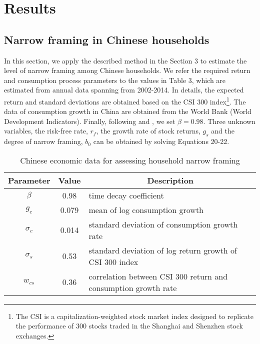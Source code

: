 \documentclass[ukenglish,nottitlepage,thmsb,11pt,letterpaper]{article}
\begin{document}
\section{Results}

 

\subsection{Narrow framing in Chinese households}

In this section, we apply the described method  in the Section 3 to estimate the level of narrow framing among Chinese households. We refer the required return and consumption process parameters to the values in Table 3, which are estimated from annual data spanning from 2002-2014. In details, the expected return and standard deviations are obtained based on the CSI 300 index\footnote{The CSI is a capitalization-weighted stock market index designed to replicate the performance of 300 stocks traded in the Shanghai and Shenzhen stock exchanges.}. The data of  consumption growth in China are obtained from the World Bank (World Development Indicators). Finally, following \citet{Barberis2009} and \citet{Giorgi2012}, we set $\beta = 0.98$. Three unknown variables, the risk-free rate, $r_f$, the growth rate of stock returns, $g_s$ and the degree of narrow framing, $b_0$ can be obtained by solving Equations 20-22. 


\begin{spacing}{1}
\begin{table}[H]
	\renewcommand\arraystretch{1.5}%
	\centering
	\caption{Chinese economic data for assessing household narrow framing}
	\begin{tabular}{ccl}
		\toprule
		Parameter   & \multicolumn{1}{c}{Value} & \multicolumn{1}{c}{Description} \\
		\midrule
		$\beta$       & 0.98       &   time decay coefficient \\
		$g_c$         & 0.079      &   mean of log consumption growth \\
		$\sigma_c$      & 0.014      &  standard deviation of consumption growth rate\\
		$\sigma_s$      & 0.53       &   standard deviation  of log return growth of CSI 300 index \\
		$w_{cs}$       & 0.36       &  correlation between CSI 300 return and consumption growth rate\\
		\bottomrule
	\end{tabular}%
	\label{tab:addlabel}%
\end{table}%
\end{spacing}
\end{document}
